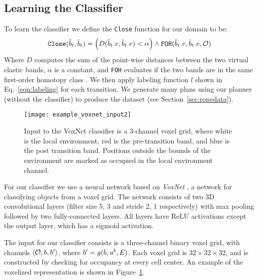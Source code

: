\subsection{Learning the Classifier}

To learn the classifier we define the \texttt{Close} function for our domain to be:
$$
\texttt{Close}(\hat {b}_t, \tilde {b}_t) = \left( D(\hat {b}_t.v, \tilde {b}_t.v) < \alpha \right) \land \texttt{FOH}(\hat {b}_t.v, \tilde {b}_t.v,\mathcal{O})
$$
\noindent Where $D$ computes the sum of the point-wise distances between the two virtual elastic bands, $\alpha$ is a constant, and \texttt{FOH} evaluates if the two bands are in the same first-order homotopy class \cite{Jaillet2008}. We then apply labeling function $l$ shown in Eq.~\ref{eqn:labeling} for each transition. We generate many plans using our planner (without the classifier) to produce the dataset (see Section~\ref{sec:ropedata}).

\begin{figure}[h]
    \centering
    \texttt{[image: example\_voxnet\_input2]}
    \caption{Input to the VoxNet classifier is a 3-channel voxel grid, where white is the local environment, red is the pre-transition band, and blue is the post transition band. Positions outside the bounds of the environment are marked as occupied in the local environment channel.}
    \label{fig:VoxNet_input}
\end{figure}

For our classifier we use a neural network based on \textit{VoxNet} \cite{Maturana2015VoxNet}, a network for classifying objects from a voxel grid. The network consists of two 3D convolutional layers (filter size 5, 3 and stride 2, 1 respectively) with max pooling followed by two fully-connected layers. All layers have ReLU activations except the output layer, which has a sigmoid activation.

The input for our classifier consists is a three-channel binary voxel grid, with channels  $\left<\mathcal{O}, b, b'\right>$, where $b' = g(b, u^b, E)$. Each voxel grid is $32\times32\times32$, and is constructed by checking for occupancy at every cell center. An example of the voxelized representation is shown in Figure~\ref{fig:VoxNet_input}.



